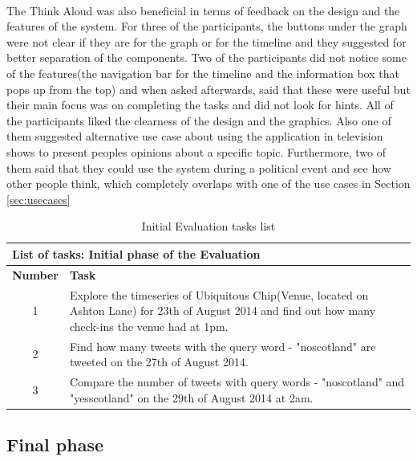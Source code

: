 \documentclass{l4proj}
\begin{document}
\paragraph{}
The Think Aloud was also beneficial in terms of feedback on the design and the features of the system. For three of the participants, the buttons under the graph were not clear if they are for the graph or for the timeline and they suggested for better separation of the components. Two of the participants did not notice some of the features(the navigation bar for the timeline and the information box that pops up from the top) and when asked afterwards, said that these were useful but their main focus was on completing the tasks and did not look for hints. All of the participants liked the clearness of the design and the graphics. Also one of them suggested alternative use case about using the application in television shows to present people\textquotesingle s opinions about a specific topic. Furthermore, two of them said that they could use the system during a political event and see how other people think, which completely overlaps with one of the use cases in Section \ref{sec:usecases} 
\begin{table}[ht]
	\centering
	\begin{adjustbox}{width=1\textwidth}
		\begin{tabular}{|c|p{14cm}|}\hline
			\multicolumn{2}{|l|}{\textbf{List of tasks: Initial phase of the Evaluation}} \\\hline
			\textbf{Number} & \textbf{Task} \\ \hline
			1
			&
			Explore the timeseries of Ubiquitous Chip(Venue, located on Ashton Lane) for 23th of August 2014 and find out how many check-ins the venue had at 1pm.
			\tabularnewline\hline
			2
			&
			Find how many tweets with the query word - "noscotland" are tweeted on the 27th of August 2014.
			\tabularnewline\hline
			3
			&
			Compare the number of tweets with query words - "noscotland" and "yesscotland" on the 29th of August 2014 at 2am.
			\tabularnewline\hline
		\end{tabular}
	\end{adjustbox}
	\caption{Initial Evaluation tasks list}
	\label{tab:initialevaltasks}
\end{table}

\subsection{Final phase}
\label{sub:finalphase}
\end{document}
